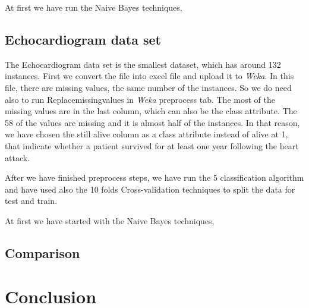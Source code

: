 \documentclass[a4paper]{article}
\begin{document}
At first we have run the Naive Bayes techniques,


\subsection{Echocardiogram data set}

The Echocardiogram data set is the smallest dataset, which has around 132 instances. First we convert the file into excel file and upload it to \emph{Weka}. In this file, there are missing values, the same number of the instances. So we do need also to run Replacemissingvalues in \emph{Weka} preprocess tab. The most of the missing values are in the last column, which can also be the class attribute. The 58 of the values are missing and it is almost half of the instances. In that reason, we have chosen the still alive column as a class attribute instead of alive at 1, that indicate whether a patient survived for at least one year following the heart attack. 

After we have finished preprocess steps, we have run the 5 classification algorithm and have used also the 10 folds Cross-validation techniques to split the data for test and train. 

At first we have started with the Naive Bayes techniques,







\subsection{Comparison}

\section{Conclusion}
\end{document}
